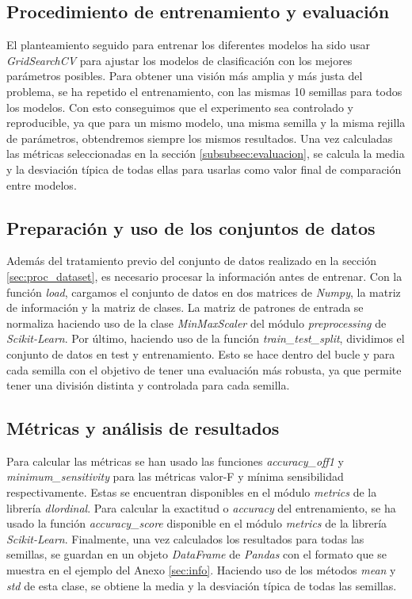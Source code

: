 \subsection{Procedimiento de entrenamiento y evaluación}
\label{subsec:procedimiento}

El planteamiento seguido para entrenar los diferentes modelos ha sido usar \textit{GridSearchCV} para ajustar los modelos de clasificación con los mejores parámetros posibles. Para obtener una visión más amplia y más justa del problema, se ha repetido el entrenamiento, con las mismas 10 semillas para todos los modelos. Con esto conseguimos que el experimento sea controlado y reproducible, ya que para un mismo modelo, una misma semilla y la misma rejilla de parámetros, obtendremos siempre los mismos resultados. Una vez calculadas las métricas seleccionadas en la sección \ref{subsubsec:evaluacion}, se calcula la media y la desviación típica de todas ellas para usarlas como valor final de comparación entre modelos.

\subsection{Preparación y uso de los conjuntos de datos}
\label{subsec:datos_experimentales}

Además del tratamiento previo del conjunto de datos realizado en la sección \ref{sec:proc_dataset}, es necesario procesar la información antes de entrenar. Con la función \textit{load}, cargamos el conjunto de datos en dos matrices de \textit{Numpy}, la matriz de información y la matriz de clases. La matriz de patrones de entrada se normaliza haciendo uso de la clase \textit{MinMaxScaler} del módulo \textit{preprocessing} de \textit{Scikit-Learn}. Por último, haciendo uso de la función \textit{train\_test\_split}, dividimos el conjunto de datos en test y entrenamiento. Esto se hace dentro del bucle y para cada semilla con el objetivo de tener una evaluación más robusta, ya que permite tener una división distinta y controlada para cada semilla.

\subsection{Métricas y análisis de resultados}
\label{subsec:metricas_pruebas}

Para calcular las métricas se han usado las funciones \textit{accuracy\_off1} y \textit{minimum\_sensitivity} para las métricas valor-F y mínima sensibilidad respectivamente. Estas se encuentran disponibles en el módulo \textit{metrics} de la librería \textit{dlordinal}. Para calcular la exactitud o \textit{accuracy} del entrenamiento, se ha usado la función \textit{accuracy\_score} disponible en el módulo \textit{metrics} de la librería \textit{Scikit-Learn}. Finalmente, una vez calculados los resultados para todas las semillas, se guardan en un objeto \textit{DataFrame} de \textit{Pandas} con el formato que se muestra en el ejemplo del Anexo \ref{sec:info}. Haciendo uso de los métodos \textit{mean} y \textit{std} de esta clase, se obtiene la media y la desviación típica de todas las semillas.
